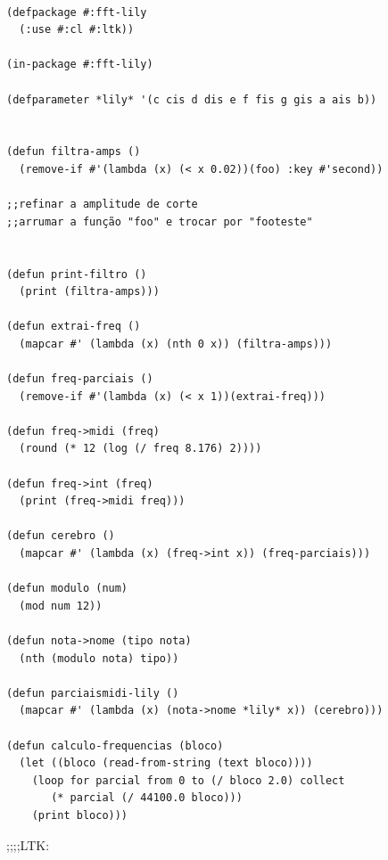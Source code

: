 \documentclass{ppgmus}
\begin{document}
\begin{verbatim}
 
(defpackage #:fft-lily
  (:use #:cl #:ltk))

(in-package #:fft-lily)

(defparameter *lily* '(c cis d dis e f fis g gis a ais b))


(defun filtra-amps ()
  (remove-if #'(lambda (x) (< x 0.02))(foo) :key #'second))

;;refinar a amplitude de corte
;;arrumar a função "foo" e trocar por "footeste"


(defun print-filtro ()
  (print (filtra-amps)))

(defun extrai-freq ()
  (mapcar #' (lambda (x) (nth 0 x)) (filtra-amps))) 

(defun freq-parciais ()
  (remove-if #'(lambda (x) (< x 1))(extrai-freq)))

(defun freq->midi (freq)
  (round (* 12 (log (/ freq 8.176) 2))))

(defun freq->int (freq)
  (print (freq->midi freq)))

(defun cerebro ()
  (mapcar #' (lambda (x) (freq->int x)) (freq-parciais))) 

(defun modulo (num)
  (mod num 12))

(defun nota->nome (tipo nota)
  (nth (modulo nota) tipo))

(defun parciaismidi-lily ()
  (mapcar #' (lambda (x) (nota->nome *lily* x)) (cerebro)))

(defun calculo-frequencias (bloco)
  (let ((bloco (read-from-string (text bloco))))
    (loop for parcial from 0 to (/ bloco 2.0) collect
       (* parcial (/ 44100.0 bloco)))
    (print bloco)))

\end{verbatim}



;;;;LTK:
\end{document}
